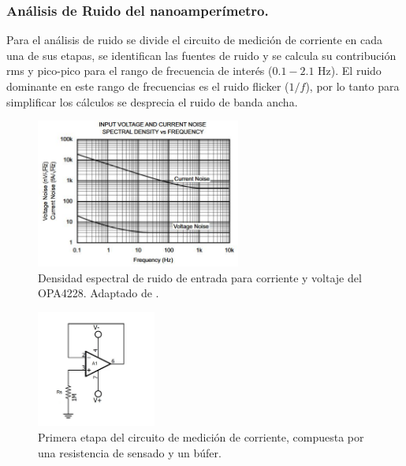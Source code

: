 \subsubsection{Análisis de Ruido del nanoamperímetro.}
Para el análisis de ruido se divide el circuito de medición de corriente en cada una de sus etapas, se identifican las fuentes de ruido y se calcula su contribución rms y pico-pico para el rango de frecuencia de interés ($0.1-2.1 $ Hz). El ruido dominante en este rango de frecuencias es el ruido flicker ($1/f$), por lo tanto para simplificar los cálculos se desprecia el ruido de banda ancha.
\begin{figure}[h!]
\begin{centering}
  \includegraphics[width=0.6\textwidth]{Images/Noise_opa.JPG}
    \caption{Densidad espectral de ruido de entrada para corriente y voltaje del OPA4228. Adaptado de \citep{OPA_4228}. }
    \label{fig:noise_espectral}
  \par\end{centering}
\end{figure}
\begin{figure}[h!]
\begin{centering}
  \includegraphics[width=0.35\textwidth]{Images/ammeter_buffer.JPG}
    \caption{Primera etapa del circuito de medición de corriente, compuesta por una resistencia de sensado y un búfer. }
    \label{fig:ammeter_buffer}
  \par\end{centering}
\end{figure}
